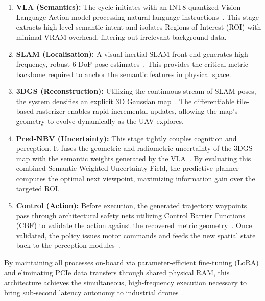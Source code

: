 \documentclass[conference]{IEEEtran}
\begin{document}
\begin{enumerate}
	\item \textbf{VLA (Semantics):} The cycle initiates with an INT8-quantized Vision-Language-Action model processing natural-language instructions~\cite{vla_concepts_2024, astribot2025lumo}. This stage extracts high-level semantic intent and isolates Regions of Interest (ROI) with minimal VRAM overhead, filtering out irrelevant background data.
	
	\item \textbf{SLAM (Localisation):} A visual-inertial SLAM front-end generates high-frequency, robust 6-DoF pose estimates~\cite{cao2024mcgs}. This provides the critical metric backbone required to anchor the semantic features in physical space.
	
	\item \textbf{3DGS (Reconstruction):} Utilizing the continuous stream of SLAM poses, the system densifies an explicit 3D Gaussian map~\cite{liu2025survey3dgs}. The differentiable tile-based rasterizer enables rapid incremental updates, allowing the map's geometry to evolve dynamically as the UAV explores.
	
	\item \textbf{Pred-NBV (Uncertainty):} This stage tightly couples cognition and perception. It fuses the geometric and radiometric uncertainty of the 3DGS map with the semantic weights generated by the VLA~\cite{bai2025qwen3vl}. By evaluating this combined Semantic-Weighted Uncertainty Field, the predictive planner computes the optimal next viewpoint, maximizing information gain over the targeted ROI.
	
	\item \textbf{Control (Action):} Before execution, the generated trajectory waypoints pass through architectural safety nets utilizing Control Barrier Functions (CBF) to validate the action against the recovered metric geometry~\cite{mohrle2025concept}. Once validated, the policy issues motor commands and feeds the new spatial state back to the perception modules~\cite{li2025switchvla}.
\end{enumerate}

By maintaining all processes on-board via parameter-efficient fine-tuning (LoRA) and eliminating PCIe data transfers through shared physical RAM, this architecture achieves the simultaneous, high-frequency execution necessary to bring sub-second latency autonomy to industrial drones~\cite{edge_opt2024, zhang2025autonomous}.

\end{document}
